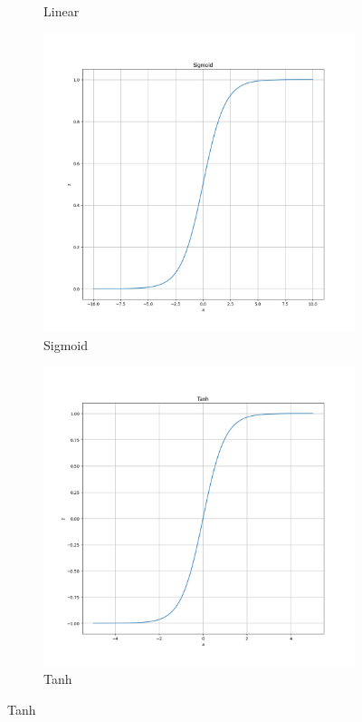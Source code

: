 \begin{figure}
\begin{subfigure}{0.24\linewidth}
		\caption{Linear}
	\end{subfigure}
	\begin{subfigure}{0.24\linewidth}
		\includegraphics[width=\linewidth]{figures/sigmoid.png}
		\caption{Sigmoid}
	\end{subfigure}
	\begin{subfigure}{0.24\linewidth}
		\includegraphics[width=\linewidth]{figures/tanh.png}
		\caption{Tanh}
	\end{subfigure}
	

\end{figure}
